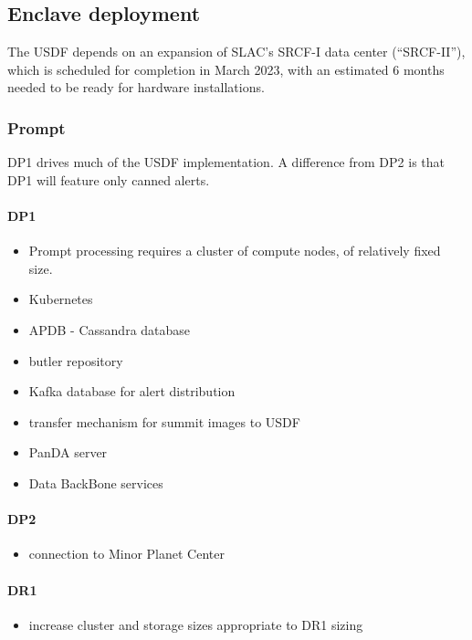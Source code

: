 \subsection {Enclave deployment}

The USDF depends on an expansion of SLAC's SRCF-I data center
(``SRCF-II''), which is scheduled for completion in March 2023, with
an estimated 6 months needed to be ready for hardware installations.

\subsubsection{Prompt}

DP1 drives much of the USDF implementation. A difference from DP2 is
that DP1 will feature only canned alerts. 

\paragraph{ DP1}

 \begin{itemize}
  \item Prompt processing requires a cluster of compute nodes, of
    relatively fixed size.
  \item Kubernetes
  \item \gls{APDB} - Cassandra database
  \item butler repository
  \item Kafka database for alert distribution
  \item transfer mechanism for summit images to USDF
  \item PanDA server
  \item Data BackBone services
 \end{itemize}

 \paragraph{DP2}

 \begin{itemize}
 \item connection to Minor Planet Center
  \end{itemize}

 \paragraph{DR1}

 \begin{itemize}
 \item increase cluster and storage sizes appropriate to DR1 sizing
 \end{itemize}

